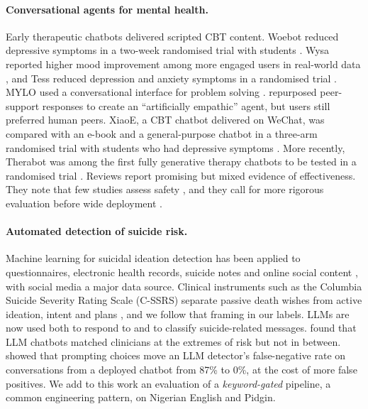 \paragraph{Conversational agents for mental health.} Early therapeutic chatbots delivered scripted CBT content. Woebot reduced depressive symptoms in a two-week randomised trial with students \citep{fitzpatrick2017woebot}. Wysa reported higher mood improvement among more engaged users in real-world data \citep{inkster2018wysa}, and Tess reduced depression and anxiety symptoms in a randomised trial \citep{fulmer2018tess}. MYLO used a conversational interface for problem solving \citep{gaffney2014mylo}. \citet{morris2018empathic} repurposed peer-support responses to create an ``artificially empathic'' agent, but users still preferred human peers. XiaoE, a CBT chatbot delivered on WeChat, was compared with an e-book and a general-purpose chatbot in a three-arm randomised trial with students who had depressive symptoms \citep{he2022xiaoe}. More recently, Therabot was among the first fully generative therapy chatbots to be tested in a randomised trial \citep{heinz2025therabot}. Reviews report promising but mixed evidence of effectiveness. They note that few studies assess safety \citep{abdalrazaq2020effectiveness}, and they call for more rigorous evaluation before wide deployment \citep{boucher2021review,casu2024scoping,balcombe2023chatbots}.

\paragraph{Automated detection of suicide risk.} Machine learning for suicidal ideation detection has been applied to questionnaires, electronic health records, suicide notes and online social content \citep{ji2021sid}, with social media a major data source. Clinical instruments such as the Columbia Suicide Severity Rating Scale (C-SSRS) separate passive death wishes from active ideation, intent and plans \citep{posner2011cssrs}, and we follow that framing in our labels. LLMs are now used both to respond to and to classify suicide-related messages. \citet{mcbain2025alignment} found that LLM chatbots matched clinicians at the extremes of risk but not in between. \citet{weber2026crisis} showed that prompting choices move an LLM detector's false-negative rate on conversations from a deployed chatbot from 87\% to 0\%, at the cost of more false positives. We add to this work an evaluation of a \emph{keyword-gated} pipeline, a common engineering pattern, on Nigerian English and Pidgin.

